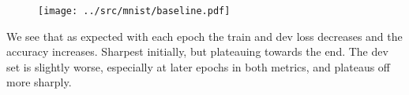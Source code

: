 %
%
\begin{answer}
\begin{figure}[H]
\texttt{[image: ../src/mnist/baseline.pdf]}
\end{figure}
We see that as expected with each epoch the train and dev loss decreases and the accuracy increases. Sharpest initially, but plateauing towards the end. The dev set is slightly worse, especially at later epochs in both metrics, and plateaus off more sharply.
\end{answer}
%
  
  
